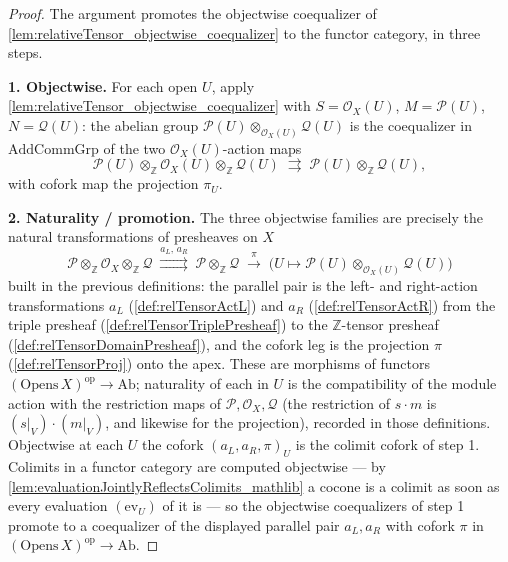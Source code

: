 \begin{proof}
  The argument promotes the objectwise coequalizer of
  \cref{lem:relativeTensor_objectwise_coequalizer} to the functor category, in
  three steps.

  \textbf{1. Objectwise.} For each open \(U\), apply
  \cref{lem:relativeTensor_objectwise_coequalizer} with \(S = \mathcal{O}_X(U)\),
  \(M = \mathcal{P}(U)\), \(N = \mathcal{Q}(U)\): the abelian group
  \(\mathcal{P}(U) \otimes_{\mathcal{O}_X(U)} \mathcal{Q}(U)\) is the coequalizer
  in \(\mathrm{AddCommGrp}\) of the two \(\mathcal{O}_X(U)\)-action maps
  \[
    \mathcal{P}(U) \otimes_{\mathbb{Z}} \mathcal{O}_X(U)
      \otimes_{\mathbb{Z}} \mathcal{Q}(U)
    \;\rightrightarrows\;
    \mathcal{P}(U) \otimes_{\mathbb{Z}} \mathcal{Q}(U),
  \]
  with cofork map the projection \(\pi_U\).

  \textbf{2. Naturality / promotion.} The three objectwise families are precisely
  the natural transformations of presheaves on \(X\)
  \[
    \mathcal{P} \otimes_{\mathbb{Z}} \mathcal{O}_X
      \otimes_{\mathbb{Z}} \mathcal{Q}
    \;\overset{a_L,\,a_R}{\rightrightarrows}\;
    \mathcal{P} \otimes_{\mathbb{Z}} \mathcal{Q}
    \;\overset{\pi}{\longrightarrow}\;
    \bigl(U \mapsto \mathcal{P}(U) \otimes_{\mathcal{O}_X(U)} \mathcal{Q}(U)\bigr)
  \]
  built in the previous definitions: the parallel pair is the left- and
  right-action transformations \(a_L\) (\cref{def:relTensorActL}) and \(a_R\)
  (\cref{def:relTensorActR}) from the triple presheaf
  (\cref{def:relTensorTriplePresheaf}) to the \(\mathbb{Z}\)-tensor presheaf
  (\cref{def:relTensorDomainPresheaf}), and the cofork leg is the projection
  \(\pi\) (\cref{def:relTensorProj}) onto the apex. These are morphisms of
  functors \((\mathrm{Opens}\,X)^{\mathrm{op}} \to \mathrm{Ab}\); naturality of
  each in \(U\) is the compatibility of the module action with the restriction
  maps of \(\mathcal{P}, \mathcal{O}_X, \mathcal{Q}\) (the restriction of
  \(s \cdot m\) is \((s|_V) \cdot (m|_V)\), and likewise for the projection),
  recorded in those definitions. Objectwise at each \(U\) the cofork
  \((a_L, a_R, \pi)_U\) is the colimit cofork of step 1. Colimits in a functor
  category are computed objectwise --- by
  \cref{lem:evaluationJointlyReflectsColimits_mathlib} a cocone is a colimit as
  soon as every evaluation \((\mathrm{ev}_U)\) of it is --- so the objectwise
  coequalizers of step 1 promote to a coequalizer of the displayed parallel pair
  \(a_L, a_R\) with cofork \(\pi\) in
  \((\mathrm{Opens}\,X)^{\mathrm{op}} \to \mathrm{Ab}\).


\end{proof}
